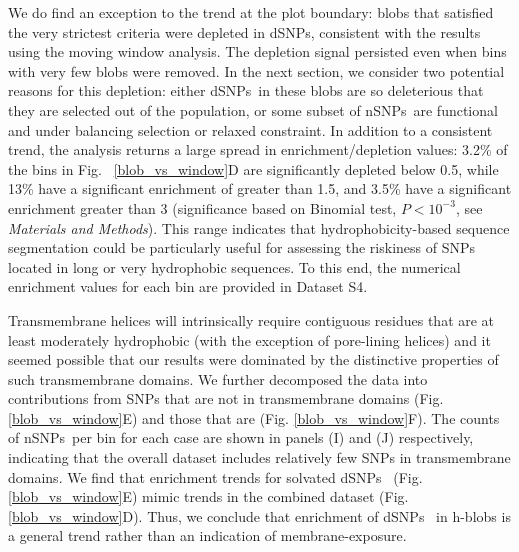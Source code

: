 \documentclass[9pt,twocolumn,twoside,lineno]{pnas-new}
\newcommand{\inserted}[1]{{#1}}
\newcommand{\dSNPs}{dSNPs~}
\newcommand{\nSNPs}{nSNPs~}
\begin{document}
We do find an exception to the trend at the plot boundary: blobs that satisfied the very strictest criteria were depleted in dSNPs, consistent with the results using the moving window analysis. The depletion signal persisted even when bins with very few blobs were removed. In the next section, we consider two potential reasons for this depletion: either \dSNPs in these blobs are so deleterious that they are selected out of the population, or some subset of \nSNPs are functional and under balancing selection or relaxed constraint. In addition to a consistent trend, the analysis returns a large spread in enrichment/depletion values:  3.2\% of the bins in Fig. ~\ref{blob_vs_window}D are significantly depleted below 0.5, while 13\% have a significant enrichment of greater than 1.5, and 3.5\% have a significant enrichment greater than 3 (significance based on Binomial test, $P<10^{-3}$, see {\em Materials and Methods}). This range indicates that hydrophobicity-based sequence segmentation could be particularly useful for assessing the riskiness of SNPs located in long or very hydrophobic sequences. To this end, the numerical enrichment values for each bin are provided in Dataset S4.

\inserted{Transmembrane helices will intrinsically require contiguous residues that are at least moderately hydrophobic (with the exception of pore-lining helices) and it seemed possible that our results were dominated by the distinctive properties of such transmembrane domains. We further decomposed the data into contributions from SNPs that are not in transmembrane domains (Fig. \ref{blob_vs_window}E) and those that are (Fig. \ref{blob_vs_window}F). The counts of \nSNPs per bin for each case are shown in panels (I) and (J) respectively, indicating that the overall dataset includes relatively few SNPs in transmembrane domains. We find that enrichment trends for solvated \dSNPs{} (Fig. \ref{blob_vs_window}E) mimic trends in the combined dataset (Fig. \ref{blob_vs_window}D). Thus, we conclude that enrichment of \dSNPs{} in h-blobs is a general trend rather than an indication of membrane-exposure.}
\end{document}
